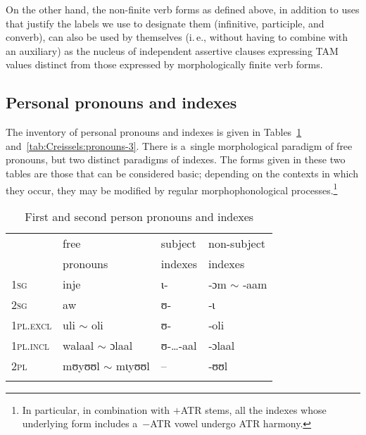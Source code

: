 \documentclass[output=paper]{langscibook}
\begin{document}
On the other hand, the non-finite verb forms as defined above, in addition to
uses that justify the labels we use to designate them (infinitive, participle,
and converb), can also be used by themselves (i.\,e., without having to combine
with an auxiliary) as the nucleus of independent assertive clauses expressing
TAM values distinct from those expressed by morphologically finite verb forms.

\subsection{Personal pronouns and indexes}%
\label{sec:Creissels:pers-pronouns}

The inventory of personal pronouns and indexes is given in
Tables~\ref{tab:Creissels:pronouns-1-2} and~\ref{tab:Creissels:pronouns-3}.  There is
a~single morphological paradigm of free pronouns, but two distinct paradigms of
indexes.  The forms given in these two tables are those that can be considered
basic; depending on the contexts in which they occur, they may be modified by
regular morphophonological processes.\footnote{ In particular, in combination
  with $+$ATR stems, all the indexes whose underlying form includes a~$-$ATR
  vowel undergo ATR harmony. }

\begin{table}[ht]
  \centering
  \begin{tabular}{llll}
    \lsptoprule
    & {free} & {subject} & {non-subject}\\
    & {pronouns} & {indexes} & {indexes} \\
    \hline
    \textsc{1sg} & {inje} & {ɩ‑} & {‑ɔm} $\sim$ {‑aam} \\
    \textsc{2sg} & {aw} & {ʊ‑} & {‑ɩ} \\
    \textsc{1pl.excl} & {uli} $\sim$ {oli} & {ʊ‑} & {‑oli} \\
    \textsc{1pl.incl} & {walaal} $\sim$ {ɔlaal} & {ʊ‑\dots‑aal} & {‑ɔlaal} \\
    \textsc{2pl} & {mʊyʊʊl} $\sim$ {mɩyʊʊl} & -- & {‑ʊʊl} \\
    \lspbottomrule
  \end{tabular}
  \caption{First and second person pronouns and indexes}%
  \label{tab:Creissels:pronouns-1-2}
\end{table}
\end{document}
